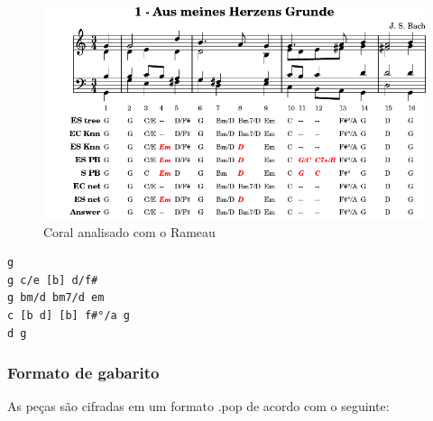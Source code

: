\documentclass[12pt,brazil]{book}
\begin{document}
\begin{figure}
  \centering
  \includegraphics[scale=.8]{analysis-001}
  \caption{Coral analisado com o Rameau}
  \label{fig:choral-rameau}
\end{figure}

\begin{verbatim}
g
g c/e [b] d/f#
g bm/d bm7/d em
c [b d] [b] f#°/a g
d g
\end{verbatim}

\subsubsection{Formato de gabarito}
\label{sec:formato-de-gabarito}

As peças são cifradas em um formato .pop de acordo com o seguinte:
\end{document}
